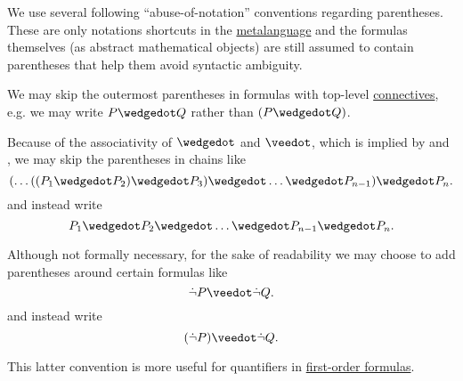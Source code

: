 \begin{remark}\label{rem:propositional_formula_parentheses}
  We use several following \enquote{abuse-of-notation} conventions regarding parentheses. These are only notations shortcuts in the \hyperref[rem:metalogic]{metalanguage} and the formulas themselves (as abstract mathematical objects) are still assumed to contain parentheses that help them avoid syntactic ambiguity.

  \begin{thmenum}
     We may skip the outermost parentheses in formulas with top-level \hyperref[def:propositional_language/connectives]{connectives}, e.g. we may write \( P \synwedge Q \) rather than \( (P \synwedge Q) \).

     Because of the associativity of \( \synwedge \) and \( \synvee \), which is implied by  and , we may skip the parentheses in chains like
    \begin{equation*}
      ( \ldots ((P_1 \synwedge P_2) \synwedge P_3) \synwedge \ldots \synwedge P_{n-1} ) \synwedge P_n.
    \end{equation*}
    and instead write
    \begin{equation*}
      P_1 \synwedge P_2 \synwedge \ldots \synwedge P_{n-1} \synwedge P_n.
    \end{equation*}

     Although not formally necessary, for the sake of readability we may choose to add parentheses around certain formulas like
    \begin{equation*}
      \synneg P \synvee \synneg Q.
    \end{equation*}
    and instead write
    \begin{equation*}
      (\synneg P) \synvee \synneg Q.
    \end{equation*}

    This latter convention is more useful for quantifiers in \hyperref[def:first_order_syntax/formula]{first-order formulas}.
  \end{thmenum}
\end{remark}

